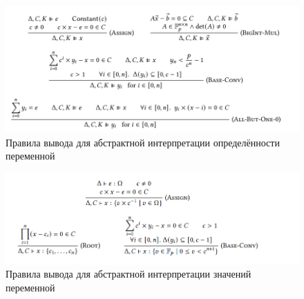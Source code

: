 \documentclass[a4paper]{article}
\begin{document}
\begin{figure}[ht!]
    \includegraphics[width=180mm]{QED_rules.png}
    \caption{Правила вывода для абстрактной интерпретации определённости переменной}
    \label{QED_rules}
\end{figure}

\begin{figure}[ht!]
    \includegraphics[width=180mm]{QED_values.png}
    \caption{Правила вывода для абстрактной интерпретации значений переменной}
    \label{QED_values}
\end{figure}
\end{document}
